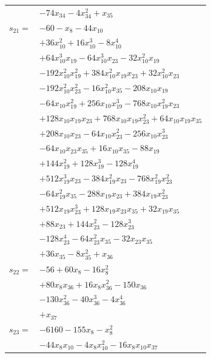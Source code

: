 \begin{longtable}{@{}r@{\;}l@{}}
 & \(\displaystyle -74x_{34} -4x_{34}^{2} +x_{35}\) \\[3pt]
\(s_{21}=\) & \(\displaystyle -60 -x_{8} -44x_{10}\) \\
 & \(\displaystyle +36x_{10}^{2} +16x_{10}^{3} -8x_{10}^{4}\) \\
 & \(\displaystyle +64x_{10}^{3}x_{19} -64x_{10}^{3}x_{23} -32x_{10}^{2}x_{19}\) \\
 & \(\displaystyle -192x_{10}^{2}x_{19}^{2} +384x_{10}^{2}x_{19}x_{23} +32x_{10}^{2}x_{23}\) \\
 & \(\displaystyle -192x_{10}^{2}x_{23}^{2} -16x_{10}^{2}x_{35} -208x_{10}x_{19}\) \\
 & \(\displaystyle -64x_{10}x_{19}^{2} +256x_{10}x_{19}^{3} -768x_{10}x_{19}^{2}x_{23}\) \\
 & \(\displaystyle +128x_{10}x_{19}x_{23} +768x_{10}x_{19}x_{23}^{2} +64x_{10}x_{19}x_{35}\) \\
 & \(\displaystyle +208x_{10}x_{23} -64x_{10}x_{23}^{2} -256x_{10}x_{23}^{3}\) \\
 & \(\displaystyle -64x_{10}x_{23}x_{35} +16x_{10}x_{35} -88x_{19}\) \\
 & \(\displaystyle +144x_{19}^{2} +128x_{19}^{3} -128x_{19}^{4}\) \\
 & \(\displaystyle +512x_{19}^{3}x_{23} -384x_{19}^{2}x_{23} -768x_{19}^{2}x_{23}^{2}\) \\
 & \(\displaystyle -64x_{19}^{2}x_{35} -288x_{19}x_{23} +384x_{19}x_{23}^{2}\) \\
 & \(\displaystyle +512x_{19}x_{23}^{3} +128x_{19}x_{23}x_{35} +32x_{19}x_{35}\) \\
 & \(\displaystyle +88x_{23} +144x_{23}^{2} -128x_{23}^{3}\) \\
 & \(\displaystyle -128x_{23}^{4} -64x_{23}^{2}x_{35} -32x_{23}x_{35}\) \\
 & \(\displaystyle +36x_{35} -8x_{35}^{2} +x_{36}\) \\[3pt]
\(s_{22}=\) & \(\displaystyle -56 +60x_{8} -16x_{8}^{2}\) \\
 & \(\displaystyle +80x_{8}x_{36} +16x_{8}x_{36}^{2} -150x_{36}\) \\
 & \(\displaystyle -130x_{36}^{2} -40x_{36}^{3} -4x_{36}^{4}\) \\
 & \(\displaystyle +x_{37}\) \\[3pt]
\(s_{23}=\) & \(\displaystyle -6160 -155x_{8} -x_{8}^{2}\) \\
 & \(\displaystyle -44x_{8}x_{10} -4x_{8}x_{10}^{2} -16x_{8}x_{10}x_{37}\) \\

\end{longtable}
